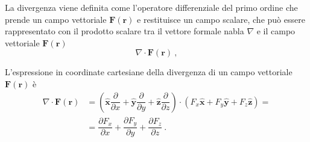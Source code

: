 \begin{definition}[Divergenza] La divergenza viene definita come l'operatore differenziale del primo ordine che prende un campo vettoriale $\mathbf{F}(\mathbf{r})$ e restituisce un campo scalare, che può essere rappresentato con il prodotto scalare tra il vettore formale nabla $\nabla$ e il campo vettoriale $\mathbf{F}(\mathbf{r})$
    \begin{equation}
        \nabla \cdot \mathbf{F}(\mathbf{r}) \ ,
    \end{equation}
\end{definition}

\begin{property}
L'espressione in coordinate cartesiane della divergenza di un campo vettoriale $\mathbf{F}(\mathbf{r})$ è
    \begin{equation}
        \begin{aligned}
            \nabla \cdot \mathbf{F}(\mathbf{r}) & = \left( \mathbf{\hat{x}} \dfrac{\partial}{\partial x} + \mathbf{\hat{y}} \dfrac{\partial}{\partial y} + \mathbf{\hat{z}} \dfrac{\partial}{\partial z} \right) \cdot (F_x \mathbf{\hat{x}} + F_y \mathbf{\hat{y}} + F_z \mathbf{\hat{z}} ) = \\
        & = \dfrac{\partial F_x}{\partial x} + \dfrac{\partial F_y}{\partial y} + \dfrac{\partial F_z}{\partial z} \ .
        \end{aligned}
    \end{equation}
\end{property}

\begin{property}
\end{property}

